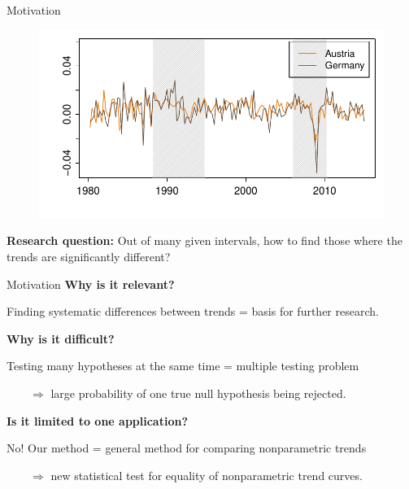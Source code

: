 \documentclass[10pt]{beamer}
\begin{document}
\begin{frame}{Motivation}
{\begin{figure}
  	\end{figure}}	
	{\onslide<4->
	\vspace{-46,81mm}
	\begin{figure}
    		\centering
    		\includegraphics[height=0.45\textheight]{plots/gdp_AUT_DEU_2.pdf}
  	\end{figure}}	
\vspace{-3mm}
{\textbf{Research question:}
	Out of many given intervals, how to find those where the trends are significantly different?}


\end{frame}

\begin{frame}{Motivation}
\vspace{-4mm}
\textbf{Why is it relevant?}

Finding systematic differences between trends = basis for further research.\pause


\vspace{3mm}

\textbf{Why is it difficult?}	

Testing many hypotheses at the same time = multiple testing problem

$\quad \quad \Rightarrow$ large probability of one true null hypothesis being rejected.\pause

\vspace{3mm}

\textbf{Is it limited to one application?}

No! Our method = general method for comparing nonparametric trends

$\quad \quad \Rightarrow$ new statistical test for equality of nonparametric trend curves.
 
\end{frame}
\end{document}
